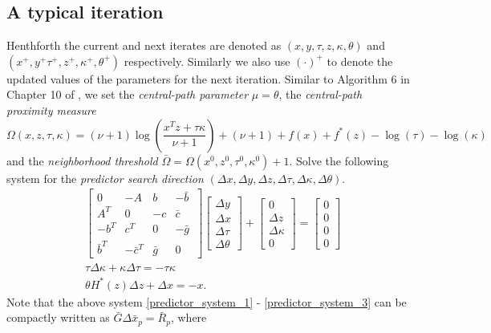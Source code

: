 \documentclass[10pt]{article}
\theoremstyle{definition}
\theoremstyle{plain}
\begin{document}
\subsection{A typical iteration}\label{A_typical_iteration}
Henthforth the current and next iterates are denoted as  $(x,y, \tau, z,\kappa, \theta)$ and  $(x^+, y^+ \tau^+, z^+,\kappa^+, \theta^+)$ respectively. Similarly we also use $(\cdot)^+$ to denote the updated values of the parameters for the next iteration. Similar to Algorithm 6 in Chapter 10 of \cite{Akle_thesis}, we set the \textit{central-path parameter} $\mu = \theta$,  the \textit{central-path proximity measure} \[\Omega(x,z,\tau,\kappa) = (\nu+1) \log\left(\frac{x^T z + \tau\kappa}{\nu+1}\right) + (\nu+1)+ f(x)+f^*(z) - \log(\tau) - \log(\kappa)\] 
and the \textit{neighborhood threshold} $\bar{\Omega} = \Omega(x^0,z^0,\tau^0,\kappa^0)+1$. 
Solve the following system for the \textit{predictor search direction} $(\Delta x, \Delta y, \Delta z, \Delta \tau, \Delta \kappa, \Delta \theta)$.
\begin{align}
& \begin{bmatrix}
0 & -A & b & -\bar b\ \\ 
A^T & 0 & -c & \bar c \\
-b^T & c^T& 0 & -\bar g \\
\bar b^T & -\bar c^T & \bar g & 0
\end{bmatrix}
\begin{bmatrix}
\Delta y \\ \Delta x \\ \Delta \tau \\ \Delta \theta
\end{bmatrix} + 
\begin{bmatrix}
0 \\ \Delta z \\ \Delta \kappa \\ 0 
\end{bmatrix} = \begin{bmatrix}
0 \\0\\0\\0
\end{bmatrix} \label{predictor_system_1} \\[1ex]
& \tau \Delta \kappa + \kappa \Delta \tau = - \tau \kappa \label{predictor_system_2} \\[1ex]
& \theta H^*(z)\Delta z + \Delta x = -x. \label{predictor_system_3}
\end{align}
Note that the above system \eqref{predictor_system_1} - \eqref{predictor_system_3} can be compactly written as $\bar G \Delta \bar x_p = \bar R_p$, where
\end{document}
